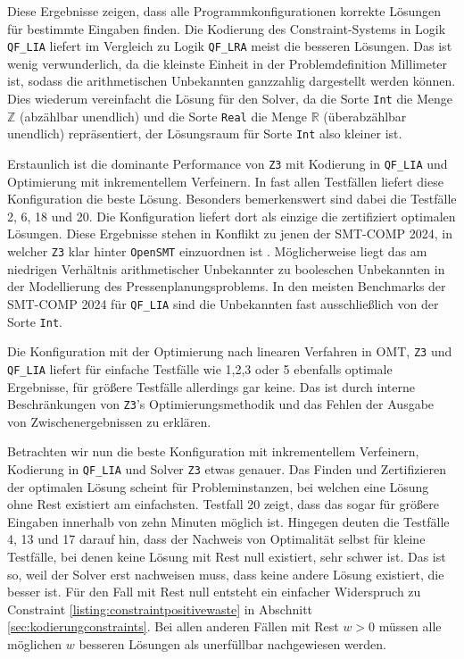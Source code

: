 Diese Ergebnisse zeigen, dass alle Programmkonfigurationen korrekte Lösungen für bestimmte Eingaben finden.
Die Kodierung des Constraint-Systems in Logik \texttt{QF\_LIA} liefert im Vergleich zu Logik \texttt{QF\_LRA} meist die besseren Lösungen.
Das ist wenig verwunderlich, da die kleinste Einheit in der Problemdefinition Millimeter ist, sodass die arithmetischen Unbekannten ganzzahlig dargestellt werden können.
Dies wiederum vereinfacht die Lösung für den Solver, da die Sorte \texttt{Int} die Menge $\mathbb{Z}$ (abzählbar unendlich) und
die Sorte \texttt{Real} die Menge $\mathbb{R}$ (überabzählbar unendlich) repräsentiert, der Lösungsraum für Sorte \texttt{Int} also kleiner ist.

Erstaunlich ist die dominante Performance von \texttt{Z3} mit Kodierung in \texttt{QF\_LIA} und Optimierung mit inkrementellem Verfeinern.
In fast allen Testfällen liefert diese Konfiguration die beste Lösung.
Besonders bemerkenswert sind dabei die Testfälle 2, 6, 18 und 20.
Die Konfiguration liefert dort als einzige die zertifiziert optimalen Lösungen.
Diese Ergebnisse stehen in Konflikt zu jenen der SMT-COMP 2024, in welcher \texttt{Z3} klar hinter \texttt{OpenSMT} einzuordnen ist \cite{smtcomp2024results}.
Möglicherweise liegt das am niedrigen Verhältnis arithmetischer Unbekannter zu booleschen Unbekannten in der Modellierung des Pressenplanungsproblems.
In den meisten Benchmarks der SMT-COMP 2024 für \texttt{QF\_LIA} sind die Unbekannten fast ausschließlich von der Sorte \texttt{Int}.

Die Konfiguration mit der Optimierung nach linearen Verfahren in OMT, \texttt{Z3} und \texttt{QF\_LIA}
liefert für einfache Testfälle wie 1,2,3 oder 5 ebenfalls optimale Ergebnisse, für größere Testfälle allerdings gar keine.
Das ist durch interne Beschränkungen von \texttt{Z3}'s Optimierungsmethodik und das Fehlen der Ausgabe von Zwischenergebnissen zu erklären.

Betrachten wir nun die beste Konfiguration mit inkrementellem Verfeinern, Kodierung in \texttt{QF\_LIA} und Solver \texttt{Z3} etwas genauer.
Das Finden und Zertifizieren der optimalen Lösung scheint für Probleminstanzen, bei welchen eine Lösung ohne Rest existiert am einfachsten.
Testfall 20 zeigt, dass das sogar für größere Eingaben innerhalb von zehn Minuten möglich ist.
Hingegen deuten die Testfälle 4, 13 und 17 darauf hin, dass der Nachweis von Optimalität selbst für kleine Testfälle,
bei denen keine Lösung mit Rest null existiert, sehr schwer ist.
Das ist so, weil der Solver erst nachweisen muss, dass keine andere Lösung existiert, die besser ist.
Für den Fall mit Rest null entsteht ein einfacher Widerspruch zu Constraint \ref{listing:constraintpositivewaste} in Abschnitt \ref{sec:kodierungconstraints}.
Bei allen anderen Fällen mit Rest $w > 0$ müssen alle möglichen $w$ besseren Lösungen als unerfüllbar nachgewiesen werden.

